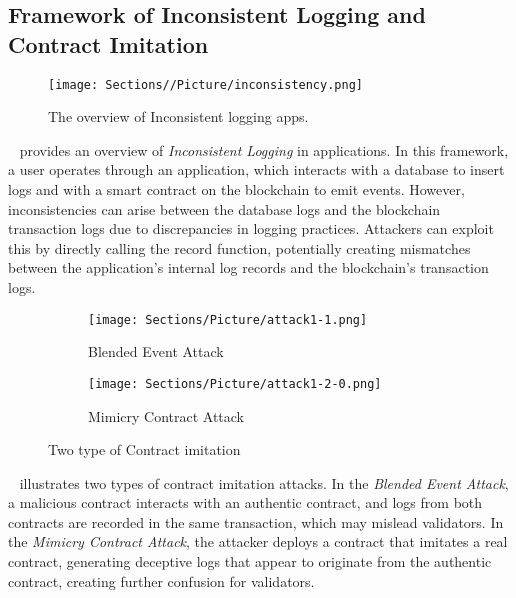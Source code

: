\subsection{Framework of Inconsistent Logging and Contract Imitation}

\begin{figure}
    \centering
    \texttt{[image: Sections//Picture/inconsistency.png]}
    \caption{The overview of Inconsistent logging apps.}
    \label{fig:Inconsistent_logging}
\end{figure}

~ provides an overview of \emph{Inconsistent Logging} in applications. In this framework, a user operates through an application, which interacts with a database to insert logs and with a smart contract on the blockchain to emit events. However, inconsistencies can arise between the database logs and the blockchain transaction logs due to discrepancies in logging practices. Attackers can exploit this by directly calling the record function, potentially creating mismatches between the application's internal log records and the blockchain's transaction logs.

\begin{figure}[!htbp]
    \centering
    \begin{subfigure}[b]{0.5\textwidth}
        \centering
        \texttt{[image: Sections/Picture/attack1-1.png]}
        \caption{Blended Event Attack}
        \label{fig:attack3-1}
    \end{subfigure}
    \quad
    \begin{subfigure}[b]{0.5\textwidth}
        \centering
        \texttt{[image: Sections/Picture/attack1-2-0.png]}
        \caption{Mimicry Contract Attack}
        \label{fig:attack3-2}
    \end{subfigure}
    \caption{Two type of Contract imitation}
    \label{fig:attack1}
\end{figure}

~ illustrates two types of contract imitation attacks. In the \emph{Blended Event Attack}, a malicious contract interacts with an authentic contract, and logs from both contracts are recorded in the same transaction, which may mislead validators. In the \emph{Mimicry Contract Attack}, the attacker deploys a contract that imitates a real contract, generating deceptive logs that appear to originate from the authentic contract, creating further confusion for validators.

